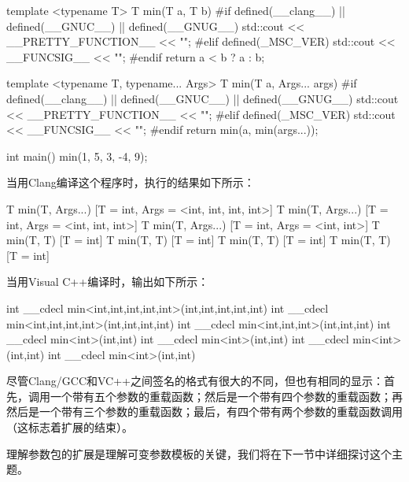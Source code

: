 \begin{cpp}
template <typename T>
T min(T a, T b)
{
#if defined(__clang__) || defined(__GNUC__) || defined(__GNUG__)
	std::cout << __PRETTY_FUNCTION__ << "\n";
#elif defined(_MSC_VER)
	std::cout << __FUNCSIG__ << "\n";
#endif
	return a < b ? a : b;
}

template <typename T, typename... Args>
T min(T a, Args... args)
{
#if defined(__clang__) || defined(__GNUC__) || defined(__GNUG__)
	std::cout << __PRETTY_FUNCTION__ << "\n";
#elif defined(_MSC_VER)
	std::cout << __FUNCSIG__ << "\n";
#endif
	return min(a, min(args...));
}

int main()
{
	min(1, 5, 3, -4, 9);
}
\end{cpp}

当用Clang编译这个程序时，执行的结果如下所示：

\begin{cpp}
T min(T, Args...) [T = int, Args = <int, int, int, int>]
T min(T, Args...) [T = int, Args = <int, int, int>]
T min(T, Args...) [T = int, Args = <int, int>]
T min(T, T) [T = int]
T min(T, T) [T = int]
T min(T, T) [T = int]
T min(T, T) [T = int]
\end{cpp}

当用Visual C++编译时，输出如下所示：

\begin{cpp}
int __cdecl min<int,int,int,int,int>(int,int,int,int,int)
int __cdecl min<int,int,int,int>(int,int,int,int)
int __cdecl min<int,int,int>(int,int,int)
int __cdecl min<int>(int,int)
int __cdecl min<int>(int,int)
int __cdecl min<int>(int,int)
int __cdecl min<int>(int,int)
\end{cpp}

尽管Clang/GCC和VC++之间签名的格式有很大的不同，但也有相同的显示：首先，调用一个带有五个参数的重载函数；然后是一个带有四个参数的重载函数；再然后是一个带有三个参数的重载函数；最后，有四个带有两个参数的重载函数调用（这标志着扩展的结束）。

理解参数包的扩展是理解可变参数模板的关键，我们将在下一节中详细探讨这个主题。



